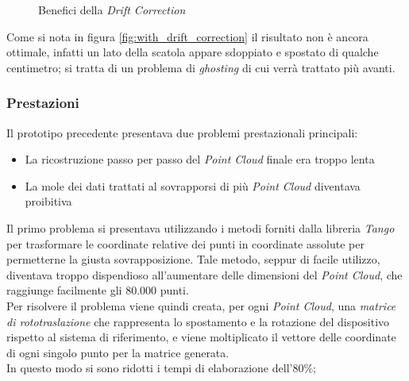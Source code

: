 \begin{figure}[htp] 
    \centering
    \hfill%
    \caption{Benefici della \emph{Drift Correction}}
\end{figure}
\newline
Come si nota in figura \ref{fig:with_drift_correction} il risultato non è ancora ottimale, infatti un lato della scatola appare sdoppiato e spostato di qualche centimetro; si tratta di un problema di \emph{ghosting} di cui verrà trattato più avanti.

\subsubsection{Prestazioni}
Il prototipo precedente presentava due problemi prestazionali principali:
\begin{itemize}
\item La ricostruzione passo per passo del \emph{Point Cloud} finale era troppo lenta
\item La mole dei dati trattati al sovrapporsi di più \emph{Point Cloud} diventava proibitiva
\end{itemize}
\noindent
Il primo problema si presentava utilizzando i metodi forniti dalla libreria \emph{Tango} per trasformare le coordinate relative dei punti in coordinate assolute per permetterne la giusta sovrapposizione. Tale metodo, seppur di facile utilizzo, diventava troppo dispendioso all'aumentare delle dimensioni del \emph{Point Cloud}, che raggiunge facilmente gli 80.000 punti.\\
Per risolvere il problema viene quindi creata, per ogni \emph{Point Cloud}, una \emph{matrice di rototraslazione} che rappresenta lo spostamento e la rotazione del dispositivo rispetto al sistema di riferimento, e viene moltiplicato il vettore delle coordinate di ogni singolo punto per la matrice generata. \\
In questo modo si sono ridotti i tempi di elaborazione dell'80\%;

